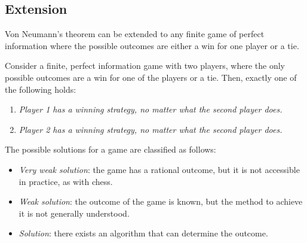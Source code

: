 \subsection{Extension}
Von Neumann's theorem can be extended to any finite game of perfect information where the possible outcomes are either a win for one player or a tie. 
\begin{corollary}
    Consider a finite, perfect information game with two players, where the only possible outcomes are a win for one of the players or a tie. 
    Then, exactly one of the following holds:
\end{corollary}
\begin{enumerate}
    \item \textit{Player 1 has a winning strategy, no matter what the second player does.}
    \item \textit{Player 2 has a winning strategy, no matter what the second player does.}
\end{enumerate}
The possible solutions for a game are classified as follows:
\begin{itemize}
    \item \textit{Very weak solution}: the game has a rational outcome, but it is not accessible in practice, as with chess.
    \item \textit{Weak solution}: the outcome of the game is known, but the method to achieve it is not generally understood.
    \item \textit{Solution}: there exists an algorithm that can determine the outcome.
\end{itemize}












